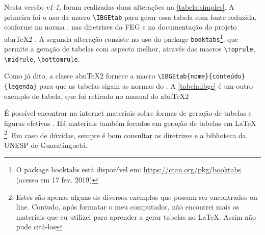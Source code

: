 \documentclass[
  12pt,		%
  a4paper,	%
  openright,%
  oneside,	%
  chapter=TITLE,		%
  section=TITLE,		%
  english,	%
  french,	%
  spanish,	%
  brazil
]{abntex2}
\begin{document}
                Nesta versão \emph{v1-1}, foram realizadas duas alterações na \autoref{tabela:simples}. A primeira foi o uso da macro \verb|\IBGEtab| para gerar essa tabela com fonte reduzida, conforme na norma \cite{ibge1993}, nas diretrizes da FEG \cite[p.~39]{diretrizes2016} e na documentação do projeto abn\TeX2 \cite[p.~39--40]{abntex2classe}. A segunda alteração consiste no uso do package \verb|booktabs|\footnote{O package booktabs está disponível em: \url{https://ctan.org/pkg/booktabs} (acesso em 17 fev. 2019)}, que permite a geração de tabelas com aspecto melhor, através das macros \verb|\toprule|, \verb|\midrule|, \verb|\bottomrule|.
                
                Como já dito, a classe abn\TeX2 fornece a macro \verb|\IBGEtab{nome}{conteúdo}| \verb|{legenda}| para que as tabelas sigam as normas do \cite{ibge1993}. A \autoref{tabela:ibge} é um outro exemplo de tabela, que foi retirado no manual do abn\TeX2 \cite{abntex2classe}.
                
                \begin{table}[htb]
                    \end{table}
                 
                 
                  É possível encontrar na internet materiais sobre formas de geração de tabelas e figuras efetivas \cite{effective_tables_figures}. Há materiais também focados em geração de tabelas em \LaTeX{}  \cite{table_latex} \footnote{Estes são apenas alguns de diversos exemplos que possam ser encontrados on-line. Contudo, após formatar o meu computador, não encontrei mais os materiais que eu utilizei para aprender a gerar tabelas no LaTeX. Assim não pude citá-los}. Em caso de dúvidas, sempre é bom consultar as diretrizes e a biblioteca da UNESP de Guaratinguetá. 
                  
\end{document}
